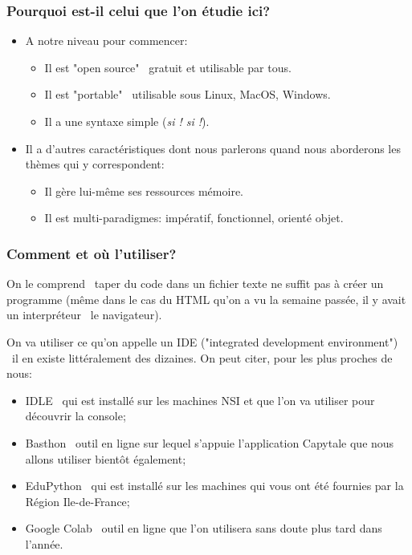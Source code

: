\documentclass[12pt]{article}
\begin{document}
	\subsubsection*{Pourquoi est-il celui que l'on étudie ici?}
	\begin{itemize}
		\item A notre niveau pour commencer:
		
		\begin{itemize}
			\item Il est "open source" \textemdash\ gratuit et utilisable par tous.
			\item Il est "portable" \textemdash\ utilisable sous Linux, MacOS, Windows.
			\item Il a une syntaxe simple (\textit{si ! si !}).
		\end{itemize}
		\item Il a d'autres caractéristiques dont nous parlerons quand nous aborderons les thèmes qui y correspondent:
		
		\begin{itemize}
			\item Il gère lui-même ses ressources mémoire.
			\item Il est multi-paradigmes: impératif, fonctionnel, orienté objet.
		\end{itemize}
	\end{itemize}
	\subsubsection*{Comment et où l'utiliser?}
	On le comprend \textemdash\ taper du code dans un fichier texte ne suffit pas à créer un programme (même dans le cas du HTML qu'on a vu la semaine passée, il y avait un interpréteur \textemdash\ le navigateur).

	On va utiliser ce qu'on appelle un IDE ("integrated development environment") \textemdash\ il en existe littéralement des dizaines. On peut citer, pour les plus proches de nous:
		
	\begin{itemize}
		\item IDLE \textemdash\ qui est installé sur les machines NSI et que l'on va utiliser pour découvrir la console;
		\item Basthon \textemdash\ outil en ligne sur lequel s'appuie l'application Capytale que nous allons utiliser bientôt également;
		\item EduPython \textemdash\ qui est installé sur les machines qui vous ont été fournies par la Région Ile-de-France;
		\item Google Colab \textemdash\ outil en ligne que l'on utilisera sans doute plus tard dans l'année.
	\end{itemize}
	
\end{document}
